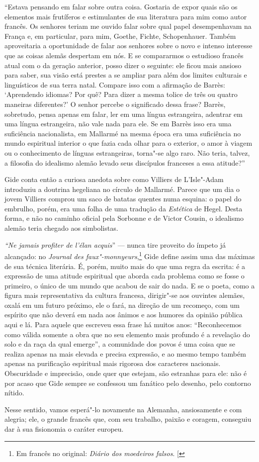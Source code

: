 ``Estava pensando em falar sobre outra coisa. Gostaria de expor quais são
os elementos mais frutíferos e estimulantes de sua literatura para mim
como autor francês. Os senhores teriam me ouvido falar sobre qual papel
desempenhavam na França e, em particular, para mim, Goethe, Fichte,
Schopenhauer. Também aproveitaria a oportunidade de falar aos
senhores sobre o novo e intenso interesse que as coisas alemãs despertam em nós.
E se compararmos o estudioso francês atual com o da geração anterior,
posso dizer o seguinte: ele ficou mais ansioso para saber, sua visão
está prestes a se ampliar para além dos limites culturais e linguísticos
de sua terra natal. Compare isso com a afirmação de Barrès: `Aprendendo
idiomas? Por quê? Para dizer a mesma tolice de três ou quatro maneiras
diferentes?' O senhor percebe o significado dessa frase? Barrès,
sobretudo, pensa apenas em falar, ler em uma língua estrangeira,
adentrar em uma língua estrangeira, não vale nada para ele. Se em Barrès
isso era uma suficiência nacionalista, em Mallarmé na mesma época era
uma suficiência no mundo espiritual interior o que fazia cada olhar para
o exterior, o amor à viagem ou o conhecimento de línguas estrangeiras,
torna"-se algo raro. Não teria, talvez, a filosofia do idealismo alemão %
levado seus discípulos franceses a essa atitude?''

Gide conta então a curiosa anedota sobre como Villiers de L'Isle"-Adam
introduziu a doutrina hegeliana no círculo de Mallarmé. Parece que um
dia o jovem Villiers comprou um saco de batatas quentes numa esquina:
o papel do embrulho, porém, era uma folha de uma tradução da
\emph{Estética} de Hegel. Desta forma, e não no caminho oficial pela
Sorbonne e de Victor Cousin, o idealismo alemão teria chegado aos
simbolistas.

\emph{``Ne jamais profiter de l'élan acquis}'' --- nunca tire proveito do
ímpeto já alcançado: no \emph{Journal des faux"-monnyeurs},\footnote{Em francês no original: \emph{Diário dos moedeiros falsos}. {[}\versal{N. T.}{]}} Gide define
assim uma das máximas de sua técnica literária. É, porém, muito mais do
que uma regra da escrita: é a expressão de uma atitude espiritual que
aborda cada problema como se fosse o primeiro, o único de um mundo que
acabou de sair do nada. E se o poeta, como a figura mais representativa
da cultura francesa, dirigir"-se aos ouvintes alemães, oxalá em um futuro
próximo, ele o fará, na direção de um recomeço, com um espírito
que não deverá em nada aos ânimos e aos humores da opinião pública aqui
e lá. Para aquele que escreveu essa frase há muitos anos:
``Reconhecemos como válida somente a obra que no seu elemento mais
profundo é a revelação do solo e da raça da qual emerge'', a comunidade
dos povos é uma coisa que se realiza apenas na mais elevada e precisa
expressão, e ao mesmo tempo também apenas na purificação espiritual mais
rigorosa dos caracteres nacionais. Obscuridade e imprecisão, onde quer
que estejam, são estranhas para ele: não é por acaso que Gide sempre se
confessou um fanático pelo desenho, pelo contorno nítido.

Nesse sentido, vamos esperá"-lo novamente na Alemanha, ansiosamente e com
alegria; ele, o grande francês que, com seu trabalho, paixão e
coragem, conseguiu dar à sua fisionomia o caráter europeu.
